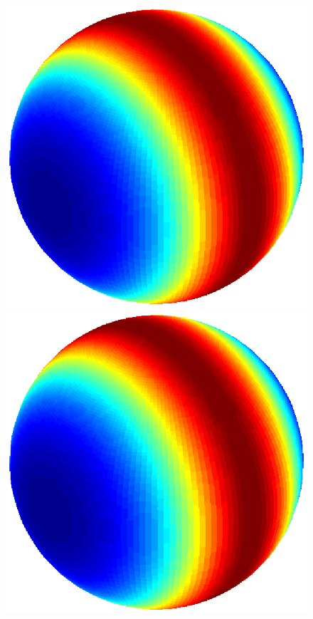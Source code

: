 \documentclass[dvips,aoas,preprint]{imsart}
\numberwithin{equation}{section}
\theoremstyle{plain}
\begin{document}
\begin{figure}[!htbp]
\begin{minipage}[]{0.12\textwidth}
    \end{minipage}
    \begin{minipage}[]{0.12\textwidth}
      \centering
      \includegraphics*[width=\textwidth]{figure4a1.eps}
    \end{minipage}
    \begin{minipage}[]{0.12\textwidth}
      \centering
      \includegraphics*[width=\textwidth]{figure4a1.eps}

\end{minipage}
\end{figure}
\end{document}
